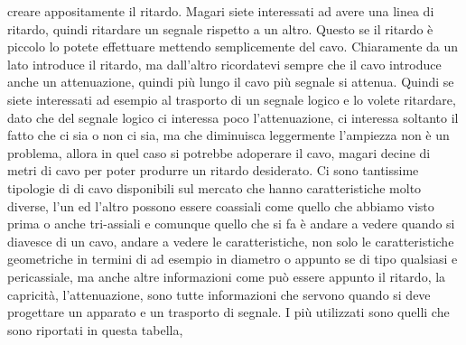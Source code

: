 {creare appositamente il ritardo. Magari siete interessati ad avere una linea di ritardo, quindi ritardare un segnale rispetto a un altro. Questo se il ritardo è piccolo lo potete effettuare mettendo semplicemente del cavo. Chiaramente da un lato introduce il ritardo, ma dall'altro ricordatevi sempre che il cavo introduce anche un attenuazione, quindi più lungo il cavo più segnale si attenua. Quindi se siete interessati ad esempio al trasporto di un segnale logico e lo volete ritardare, dato che del segnale logico ci interessa poco l'attenuazione, ci interessa soltanto il fatto che ci sia o non ci sia, ma che diminuisca leggermente l'ampiezza non è un problema, allora in quel caso si potrebbe adoperare il cavo, magari decine di metri di cavo per poter produrre un ritardo desiderato. Ci sono tantissime tipologie di di cavo disponibili sul mercato che hanno caratteristiche molto diverse, l'un ed l'altro possono essere coassiali come quello che abbiamo visto prima o anche tri-assiali e comunque quello che si fa è andare a vedere quando si diavesce di un cavo, andare a vedere le caratteristiche, non solo le caratteristiche geometriche in termini di ad esempio in diametro o appunto se di tipo qualsiasi e pericassiale, ma anche altre informazioni come può essere appunto il ritardo, la capricità, l'attenuazione, sono tutte informazioni che servono quando si deve progettare un apparato e un trasporto di segnale. I più utilizzati sono quelli che sono riportati in questa tabella, 

}
